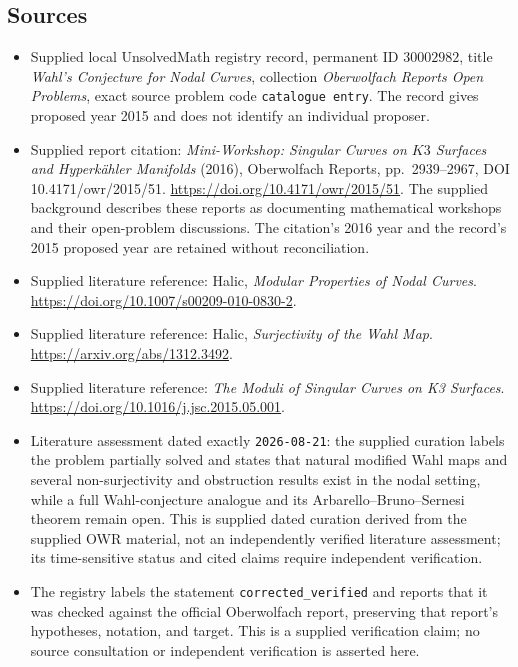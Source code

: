 \documentclass[11pt]{article}
\begin{document}
\subsection{Sources}
\begin{itemize}
\item Supplied local UnsolvedMath registry record, permanent ID \(30002982\), title \emph{Wahl's Conjecture for Nodal Curves}, collection \emph{Oberwolfach Reports Open Problems}, exact source problem code \texttt{catalogue entry}. The record gives proposed year 2015 and does not identify an individual proposer.
\item Supplied report citation: \emph{Mini-Workshop: Singular Curves on \(K3\) Surfaces and Hyperkähler Manifolds} (2016), Oberwolfach Reports, pp.\ 2939--2967, DOI 10.4171/owr/2015/51. \url{https://doi.org/10.4171/owr/2015/51}. The supplied background describes these reports as documenting mathematical workshops and their open-problem discussions. The citation's 2016 year and the record's 2015 proposed year are retained without reconciliation.
\item Supplied literature reference: Halic, \emph{Modular Properties of Nodal Curves}. \url{https://doi.org/10.1007/s00209-010-0830-2}.
\item Supplied literature reference: Halic, \emph{Surjectivity of the Wahl Map}. \url{https://arxiv.org/abs/1312.3492}.
\item Supplied literature reference: \emph{The Moduli of Singular Curves on K3 Surfaces}. \url{https://doi.org/10.1016/j.jsc.2015.05.001}.
\item Literature assessment dated exactly \texttt{2026-08-21}: the supplied curation labels the problem partially solved and states that natural modified Wahl maps and several non-surjectivity and obstruction results exist in the nodal setting, while a full Wahl-conjecture analogue and its Arbarello--Bruno--Sernesi theorem remain open. This is supplied dated curation derived from the supplied OWR material, not an independently verified literature assessment; its time-sensitive status and cited claims require independent verification.
\item The registry labels the statement \texttt{corrected\_verified} and reports that it was checked against the official Oberwolfach report, preserving that report's hypotheses, notation, and target. This is a supplied verification claim; no source consultation or independent verification is asserted here.
\end{itemize}
\end{document}
